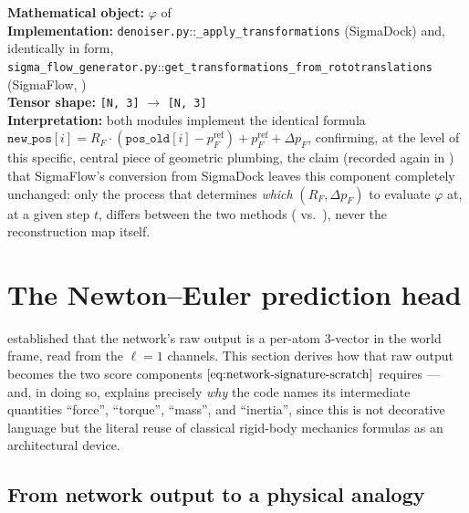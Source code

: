 \documentclass[11pt,a4paper]{report}
\theoremstyle{definition}
\theoremstyle{remark}
\newcommand{\file}[1]{\texttt{#1}}
\newcommand{\pyfunc}[1]{\texttt{#1}}
\newcommand{\shape}[1]{\texttt{[#1]}}
\begin{document}
\begin{codebox}
\textbf{Mathematical object:} $\varphi$ of
 \\
\textbf{Implementation:} \file{denoiser.py}::\pyfunc{\_apply\_transformations}
(SigmaDock) and, identically in form,
\file{sigma\_flow\_generator.py}::\pyfunc{get\_transformations\_from\_rototranslations}
(SigmaFlow, ) \\
\textbf{Tensor shape:} \shape{N, 3} $\to$ \shape{N, 3} \\
\textbf{Interpretation:} both modules implement the identical formula
$\texttt{new\_pos}[i] = R_F\cdot(\texttt{pos\_old}[i]-p_F^{\mathrm{ref}}) + p_F^{\mathrm{ref}} + \Delta p_F$,
confirming, at the level of this specific, central piece of geometric
plumbing, the claim (recorded again in ) that
SigmaFlow's conversion from SigmaDock leaves this component completely
unchanged: only the process that determines \emph{which} $(R_F,\Delta p_F)$
to evaluate $\varphi$ at, at a given step $t$, differs between the two
methods ( vs.\
), never the reconstruction map itself.
\end{codebox}

\section{The Newton--Euler prediction head}
\label{sec:newton-euler-precise}

 established that the network's raw output is
a per-atom $3$-vector in the world frame, read from the $\ell=1$ channels.
This section derives how that raw output becomes the two score components
$\eqref{eq:network-signature-scratch}$ requires --- and, in doing so,
explains precisely \emph{why} the code names its intermediate quantities
``force'', ``torque'', ``mass'', and ``inertia'', since this is not
decorative language but the literal reuse of classical rigid-body mechanics
formulas as an architectural device.

\subsection{From network output to a physical analogy}
\end{document}
